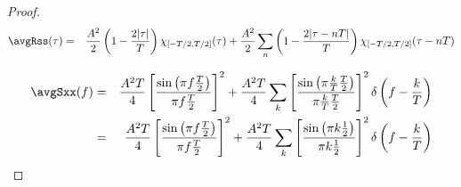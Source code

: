 \begin{proof}
\begin{eqnarray*}
   \avgRss(\tau) 
     &=& \frac{A^2}{2}\left( 1- \frac{2|\tau|}{T}\right) \chi_{[-T/2,T/2]}(\tau) + 
         \frac{A^2}{2} \sum_n \left( 1 - \frac{2|\tau-nT|}{T} \right)\chi_{[-T/2,T/2]}(\tau-nT)
\end{eqnarray*}

\begin{eqnarray*}
   \avgSxx(f)
     &=& \frac{A^2 T}{4} \left[ \frac{\sin\left(\pi f\frac{T}{2}\right)}{\pi f\frac{T}{2}}\right]^2 + 
         \frac{A^2 T}{4} \sum_k \left[ \frac{\sin\left(\pi \frac{k}{T}\frac{T}{2}\right)}{\pi \frac{k}{T}\frac{T}{2}}\right]^2 \delta\left(f-\frac{k}{T}\right) 
   \\&=& \frac{A^2 T}{4} \left[ \frac{\sin\left(\pi f\frac{T}{2}\right)}{\pi f\frac{T}{2}}\right]^2 + 
         \frac{A^2 T}{4} \sum_k \left[ \frac{\sin\left(\pi k\frac{1}{2}\right)}{\pi k\frac{1}{2}}\right]^2 \delta\left(f-\frac{k}{T}\right)
\end{eqnarray*}

\end{proof}


